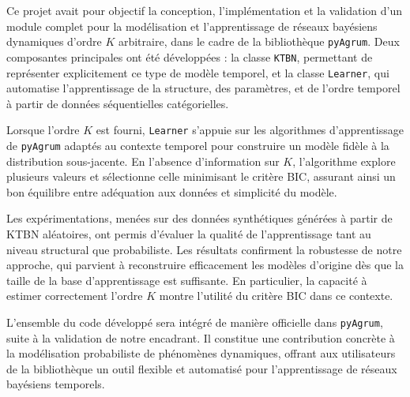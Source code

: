 \documentclass{article}
\begin{document}
Ce projet avait pour objectif la conception, l'implémentation et la validation
d'un module complet pour la modélisation et l'apprentissage de réseaux bayésiens
dynamiques d'ordre $K$ arbitraire, dans le cadre de la bibliothèque \texttt{pyAgrum}.
Deux composantes principales ont été développées : la classe \texttt{KTBN},
permettant de représenter explicitement ce type de modèle temporel, et la classe
\texttt{Learner}, qui automatise l'apprentissage de la structure, des paramètres,
et de l'ordre temporel à partir de données séquentielles catégorielles.

Lorsque l'ordre $K$ est fourni, \texttt{Learner} s'appuie sur les algorithmes
d'apprentissage de \texttt{pyAgrum} adaptés au contexte temporel pour construire
un modèle fidèle à la distribution sous-jacente. En l'absence d'information sur $K$,
l'algorithme explore plusieurs valeurs et sélectionne celle minimisant le critère BIC,
assurant ainsi un bon équilibre entre adéquation aux données et simplicité du modèle.

Les expérimentations, menées sur des données synthétiques générées à partir de KTBN
aléatoires, ont permis d'évaluer la qualité de l'apprentissage tant au niveau
structural que probabiliste. Les résultats confirment la robustesse de notre approche,
qui parvient à reconstruire efficacement les modèles d'origine dès que la taille de
la base d'apprentissage est suffisante. En particulier, la capacité à estimer
correctement l'ordre $K$ montre l'utilité du critère BIC dans ce contexte.

L'ensemble du code développé sera intégré de manière officielle dans \texttt{pyAgrum},
suite à la validation de notre encadrant. Il constitue une contribution concrète à
la modélisation probabiliste de phénomènes dynamiques, offrant aux utilisateurs de
la bibliothèque un outil flexible et automatisé pour l'apprentissage de réseaux
bayésiens temporels.



\end{document}
